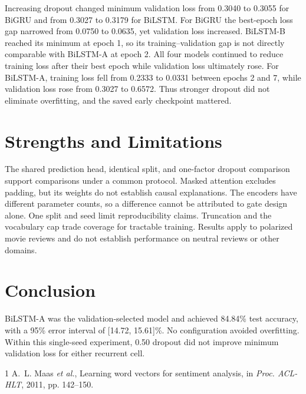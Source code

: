 \documentclass[conference]{IEEEtran}
\begin{document}
Increasing dropout changed minimum validation loss from 0.3040 to 0.3055 for BiGRU and from 0.3027 to 0.3179 for BiLSTM. For BiGRU the best-epoch loss gap narrowed from 0.0750 to 0.0635, yet validation loss increased. BiLSTM-B reached its minimum at epoch 1, so its training--validation gap is not directly comparable with BiLSTM-A at epoch 2. All four models continued to reduce training loss after their best epoch while validation loss ultimately rose. For BiLSTM-A, training loss fell from 0.2333 to 0.0331 between epochs 2 and 7, while validation loss rose from 0.3027 to 0.6572. Thus stronger dropout did not eliminate overfitting, and the saved early checkpoint mattered.


\newpage
\section{Strengths and Limitations}
The shared prediction head, identical split, and one-factor dropout comparison support comparisons under a common protocol. Masked attention excludes padding, but its weights do not establish causal explanations. The encoders have different parameter counts, so a difference cannot be attributed to gate design alone. One split and seed limit reproducibility claims. Truncation and the vocabulary cap trade coverage for tractable training. Results apply to polarized movie reviews and do not establish performance on neutral reviews or other domains.

\section{Conclusion}
BiLSTM-A was the validation-selected model and achieved 84.84\% test accuracy, with a 95\% error interval of [14.72, 15.61]\%. No configuration avoided overfitting. Within this single-seed experiment, 0.50 dropout did not improve minimum validation loss for either recurrent cell.

\begin{thebibliography}{1}
 A.~L. Maas \emph{et al.}, Learning word vectors for sentiment analysis, in \emph{Proc. ACL-HLT}, 2011, pp. 142--150.
\end{thebibliography}
\end{document}
